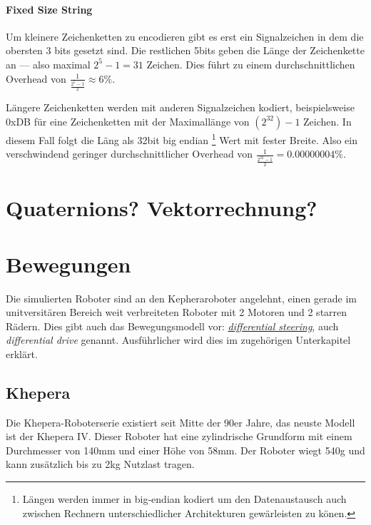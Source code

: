 \paragraph{Fixed Size String} Um kleinere Zeichenketten zu encodieren gibt es erst ein Signalzeichen  in dem die obersten 3 bits gesetzt sind. Die restlichen 5bits geben die L{\"{a}}nge der Zeichenkette an --- also maximal $2^5 - 1 = 31$ Zeichen. Dies f{\"{u}}hrt zu einem durchschnittlichen Overhead von $ \frac{1}{\frac{2^5-1}{2}} \approx 6\% $.

L{\"{a}}ngere Zeichenketten werden mit anderen Signalzeichen kodiert, beispielsweise 0xDB f{\"{u}}r eine Zeichenketten mit der Maximall{\"{a}}nge von $(2^{32})-1$ Zeichen.
In diesem Fall folgt die L{\"{a}}ng als 32bit big endian
\footnote{L{\"{a}}ngen werden immer in big-endian kodiert um den Datenaustausch auch zwischen Rechnern unterschiedlicher Architekturen gew{\"{a}}rleisten zu k{\"{o}}nen.}
Wert mit fester Breite. Also ein verschwindend geringer durchschnittlicher Overhead von $ \frac{1}{\frac{2^{32}-1}{2}} = 0.00000004\% $.

\clearpage
\section{Quaternions? Vektorrechnung?}

\clearpage
\section{Bewegungen}
Die simulierten Roboter sind an den Kepheraroboter angelehnt, einen gerade im unitversit{\"{a}}ren Bereich weit verbreiteten Roboter mit 2 Motoren und 2 starren R{\"{a}}dern.
Dies gibt auch das Bewegungsmodell vor: \hyperref[diffs]{\textit{differential steering}}, auch \textit{differential drive} genannt. Ausf{\"{u}}hrlicher wird dies im zugeh{\"{o}}rigen Unterkapitel erkl{\"{a}}rt.

\subsection{Khepera}\label{khepera}
Die Khepera-Roboterserie existiert seit Mitte der 90er Jahre, das neuste Modell ist der Khepera IV\cite{Soares2016}. Dieser Roboter hat eine zylindrische Grundform mit einem Durchmesser von 140mm und einer
H{\"{o}}he von 58mm. Der Roboter wiegt 540g und kann zus{\"{a}}tzlich bis zu 2kg Nutzlast tragen.

